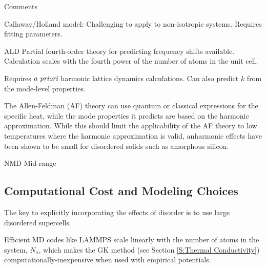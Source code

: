 Comments

Callaway/Holland model: 
Challenging to apply to non-isotropic systems. 
Requires fitting parameters. 


ALD
Partial fourth-order theory for predicting frequency shifts available. 
Calculation scales with the fourth power of the number of 
atoms in the unit cell. 

Requires $\emph{a priori}$ harmonic lattice dynamics calculations. 
Can also predict $k$ from the mode-level properties.


The Allen-Feldman (AF) theory can use quantum or classical expressions 
for the specific heat, while the mode properties it predicts are 
based on the harmonic approximation. While this should limit the 
applicability of the AF theory to low temperatures where the harmonic 
approximation is valid, anharmonic effects have been shown to be 
small for disordered solids such as amorphous silicon.
\cite{feldman_thermal_1993}

NMD Mid-range\cite{turney_predicting_2009-1}


\subsection{Computational Cost and Modeling Choices}

The key to explicitly incorporating the effects of disorder 
is to use large disordered supercells. 

Efficient MD 
codes like LAMMPS scale linearly with the number of atoms in 
the system, $N_a$, which makes the GK method (see Section 
\ref{S:Thermal Conductivity}) 
computationally-inexpensive when used with empirical potentials. 




